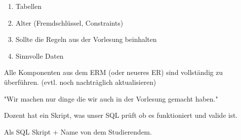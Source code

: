 \documentclass[a4paper]{article}
\begin{document}
\begin{enumerate}
    \item Tabellen
    \item Alter (Fremdschlüssel, Constraints)
    \item Sollte die Regeln aus der Vorlesung beinhalten
    \item Sinnvolle Daten
\end{enumerate}

Alle Komponenten aus dem ERM (oder neueres ER) sind vollständig zu überführen. (evtl. noch nachträglich aktualisieren)

"Wir machen nur dinge die wir auch in der Vorlesung gemacht haben."

Dozent hat ein Skript, was unser SQL prüft ob es funktioniert und valide ist.

Als SQL Skript + Name von dem Studierendem.
\end{document}
